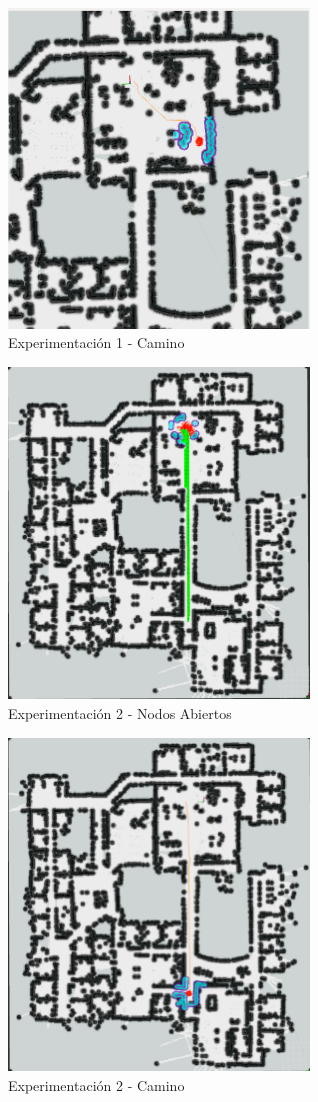 \documentclass[12pt]{article}
\begin{document}
\begin{figure}[H] 
	\centering
	\includegraphics[width=8cm]{img/exp_1_2.png}
	\caption{Experimentación 1 - Camino}
\end{figure}


\begin{figure}[H] 
	\centering
	\includegraphics[width=8cm]{img/exp_2_1.png}
	\caption{Experimentación 2 - Nodos Abiertos}
\end{figure}


\begin{figure}[H] 
	\centering
	\includegraphics[width=8cm]{img/exp_2_2.png}
	\caption{Experimentación 2 - Camino}
\end{figure}
\end{document}

